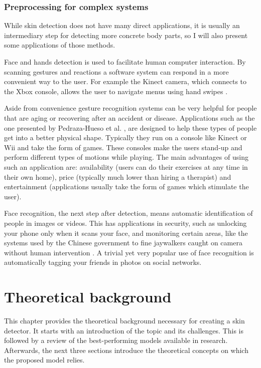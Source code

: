 \documentclass[12pt]{report}
\begin{document}
	\subsection{Preprocessing for complex systems}
	While skin detection does not have many direct applications, it is usually an intermediary step for detecting more concrete body parts, so I will also present some applications of those methods.
	
	Face and hands detection is used to facilitate human computer interaction. By scanning gestures and reactions a software system can respond in a more convenient way to the user. For example the Kinect camera, which connects to the Xbox console, allows the user to navigate menus using hand swipes \cite{kinect_control}. 
	
	Aside from convenience gesture recognition systems can be very helpful for people that are aging or recovering after an accident or disease. Applications such as the one presented by Pedraza-Hueso et al. \cite{rehabilitation_kinect}, are designed to help these types of people get into a better physical shape. Typically they run on a console like Kinect or Wii and take the form of games. These consoles make the users stand-up and perform different types of motions while playing. The main advantages of using such an application are: availability (users can do their exercises at any time in their own home), price (typically much lower than hiring a therapist) and entertainment (applications usually take the form of games which stimulate the user).
	
	Face recognition, the next step after detection, means automatic identification of people in images or videos\cite{detecting_faces_a_survey}. This has applications in security, such as unlocking your phone only when it scans your face, and monitoring certain areas, like the systems used by the Chinese government to fine jaywalkers caught on camera without human intervention \cite{jaywalkers_china}. A trivial yet very popular use of face recognition is automatically tagging your friends in photos on social networks.
	
	\chapter{Theoretical background}
	This chapter provides the theoretical background necessary for creating a skin detector. It starts with an introduction of the topic and its challenges. This is followed by a review of the best-performing models available in research. Afterwards, the next three sections introduce the theoretical concepts on which the proposed model relies.
	
\end{document}
